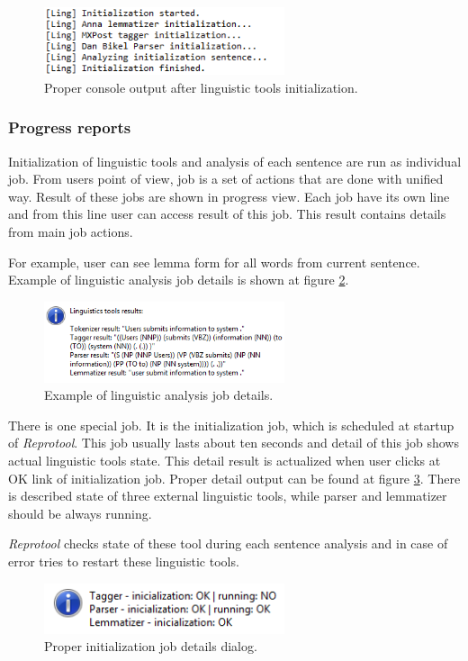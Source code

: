 \begin{figure}[ht]
  \centering
  \includegraphics[width=200pt]{images/manual-analysis/console-initialization}
  \caption{Proper console output after linguistic tools initialization.}
  \label{fig:console-initialization}
\end{figure}

\subsubsection{Progress reports}
Initialization of linguistic tools and analysis of each sentence are run as individual job. From users point of view, job is a set of actions that are done with unified way. Result of these jobs are shown in progress view. Each job have its own line and from this line user can access result of this job. This result contains details from main job actions. 

For example, user can see lemma form for all words from current sentence. Example of linguistic analysis job details is shown at figure \ref{fig:progress-detail}.

\begin{figure}[ht]
  \centering
  \includegraphics[width=200pt]{images/manual-analysis/progress-detail}
  \caption{Example of linguistic analysis job details.}
  \label{fig:progress-detail}
\end{figure}

There is one special job. It is the initialization job, which is scheduled at startup of  \emph{Reprotool}. This job usually lasts about ten seconds and detail of this job shows actual linguistic tools state. This detail result is actualized when user clicks at OK link of initialization job. Proper detail output can be found at figure \ref{fig:progress-initialization}. There is described state of three external linguistic tools, while parser and lemmatizer should be always running. 

\emph{Reprotool} checks state of these tool during each sentence analysis and in case of error tries to restart these linguistic tools.

\begin{figure}[ht]
  \centering
  \includegraphics[width=200pt]{images/manual-analysis/progress-initialization}
  \caption{Proper initialization job details dialog.}
  \label{fig:progress-initialization}
\end{figure}


 